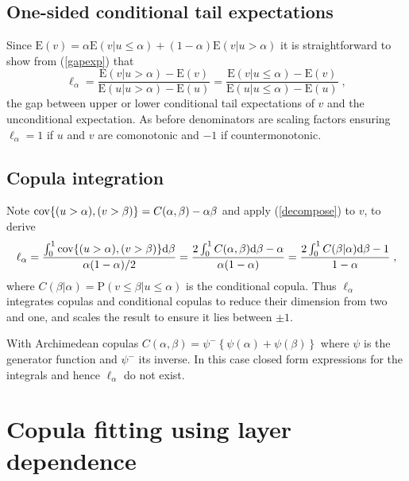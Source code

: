 \documentclass[authoryear]{elsarticle}
\newcommand{\cov}{{\rm cov}}
\newcommand{\E}{{\mathrm E}}
\newcommand{\de}{\mathrm{d}}
\newcommand{\p}{\mathrm{P}}
\newcommand{\eref}[1]{(\ref{#1})}
\begin{document}
\subsection{One-sided conditional tail expectations}


Since $\E(v)=\alpha\E(v|u\leq \alpha)+(1-\alpha)\E(v|u>\alpha)$ it is straightforward to show from \eref{gapexp} that
$$
\ell_\alpha = \frac{\E(v|u> \alpha)-\E(v)}{\E(u|u> \alpha)-\E(u)} = \frac{\E(v|u\leq \alpha)-\E(v)}{\E(u|u\leq \alpha)-\E(u)} \;,
$$
the gap between upper or lower conditional tail expectations of $v$ and the unconditional expectation. As before denominators are scaling factors ensuring $\ell_\alpha=1$ if $u$ and $v$ are comonotonic and $-1$ if countermonotonic.

\subsection{Copula integration}

Note $\cov\{(u>\alpha),(v>\beta)\}=C(\alpha,\beta)-\alpha\beta$ and apply \eref{decompose} to $v$, to derive
$$
\ell_\alpha = \frac{\int_0^1 \cov\{(u>\alpha),(v>\beta)\} \de\beta }{\alpha(1-\alpha)/2}
= \frac{2 \int_0^1 C(\alpha,\beta) \de \beta- \alpha}{\alpha(1-\alpha)} = \frac{2 \int_0^1 C(\beta|\alpha) \de \beta- 1}{1-\alpha}\;,
$$
where $C(\beta|\alpha)=\p(v\le\beta|u\le\alpha)$ is the conditional copula. Thus $\ell_\alpha$ integrates copulas and conditional copulas to reduce their dimension from two and one, and scales the result to ensure it lies between $\pm 1$.

With Archimedean copulas \citep{mcneil2005qrm} $C(\alpha,\beta) =\psi^-\left\{\psi(\alpha)+\psi(\beta)\right\}$ where $\psi$ is the generator function and $\psi^-$ its inverse. In this case closed form expressions for the integrals and hence $\ell_\alpha$ do not exist.






\section{Copula fitting using layer dependence}\label{sfitting}
\end{document}

